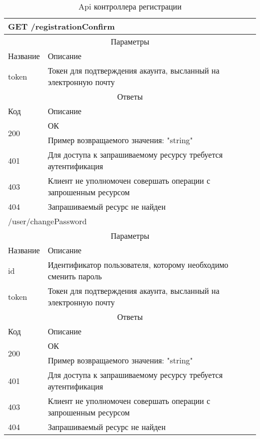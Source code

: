 \begin{table}[H]
  \caption{Api контроллера регистрации}\label{api-registration-table}
  \begin{tabular}{|p{6cm}|p{10cm}|}
  \hline \multicolumn{2}{|l|}{GET /registrationConfirm} \\
  \hline \multicolumn{2}{|c|}{Параметры} \\
  \hline Название & Описание \\
  \hline token & Токен для подтверждения акаунта, высланный на электронную почту \\
  \hline \multicolumn{2}{|c|}{Ответы} \\
  \hline Код & Описание \\
  \hline \multirow{2}{=}{200} & ОК \\
   & Пример возвращаемого значения: "string" \\
  \hline 401 & Для доступа к запрашиваемому ресурсу требуется аутентификация \\
  \hline 403 & Клиент не уполномочен совершать операции с запрошенным ресурсом \\
  \hline 404 & Запрашиваемый ресурс не найден \\
  \hline \multicolumn{2}{|l|}{/user/changePassword} \\
  \hline \multicolumn{2}{|c|}{Параметры} \\
  \hline Название & Описание \\
  \hline id & Идентификатор пользователя, которому необходимо сменить пароль \\
  \hline token & Токен для подтверждения акаунта, высланный на электронную почту \\
  \hline \multicolumn{2}{|c|}{Ответы} \\
  \hline Код & Описание \\
  \hline \multirow{2}{=}{200} & ОК \\
   & Пример возвращаемого значения: "string" \\
  \hline 401 & Для доступа к запрашиваемому ресурсу требуется аутентификация \\
  \hline 403 & Клиент не уполномочен совершать операции с запрошенным ресурсом \\
  \hline 404 & Запрашиваемый ресурс не найден \\
  \end{tabular}
\end{table}
